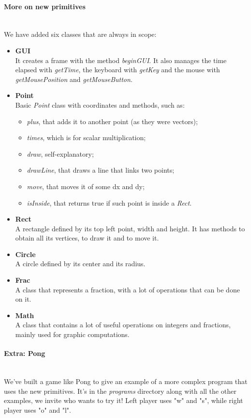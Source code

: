 \paragraph{More on new primitives}\mbox{}\\
We have added six classes that are always in scope:

\begin{itemize}
\item{\textbf{GUI}}  \hfill \\
It creates a frame with the method \textit{beginGUI}. It also manages the time elapsed with \textit{getTime}, the keyboard with \textit{getKey} and the mouse with \textit{getMousePosition} and \textit{getMouseButton}.
\item{\textbf{Point}} \hfill \\
Basic \textit{Point} class with coordinates and methods, such as:
\begin{itemize}
\item{\textit{plus}}, that adds it to another point (as they were vectors);
\item{\textit{times}}, which is for scalar multiplication;
\item{\textit{draw}}, self-explanatory;
\item{\textit{drawLine}}, that draws a line that links two points;
\item{\textit{move}}, that moves it of some dx and dy;
\item{\textit{isInside}}, that returns true if such point is inside a \textit{Rect}.
\end{itemize}
\item{\textbf{Rect}} \hfill \\
A rectangle defined by its top left point, width and height. It has methods to obtain all its vertices, to draw it and to move it.
\item{\textbf{Circle}} \hfill \\
A circle defined by its center and its radius.
\item{\textbf{Frac}} \hfill \\
A class that represents a fraction, with a lot of operations that can be done on it.
\item{\textbf{Math}} \hfill \\
A class that contains a lot of useful operations on integers and fractions, mainly used for graphic computations.
\end{itemize}

\paragraph{Extra: Pong}\mbox{}\\
We've built a game like Pong to give an example of a more complex program that uses the new primitives.
It's in the \textit{programs} directory along with all the other examples, we invite who wants to try it!
Left player uses "w" and "s", while right player uses "o" and "l".


